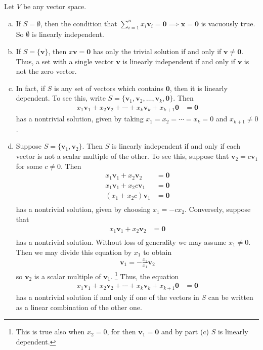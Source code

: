\documentclass[12pt,letterpaper,reqno]{article}
\numberwithin{equation}{section}
\begin{document}
\begin{example}
Let $V$ be any vector space.
\begin{enumerate}[(a)]
	\item If $S=\emptyset$, then the condition that $\sum_{i=1}^nx_i\mathbf{v}_i=\mathbf{0} \implies \mathbf{x}=\mathbf{0}$ is vacuously true. So $\emptyset$ is linearly independent.  
	\item  If $S=\{\mathbf{v}\}$, then $x\mathbf{v}=\mathbf{0}$ has only the trivial solution if and only if $\mathbf{v} \neq \mathbf{0}$. Thus, a set with a single vector $\mathbf{v}$ is linearly independent if and only if $\mathbf{v}$ is not the zero vector.
	\item In fact, if $S$ is any set of vectors which contains $\mathbf{0}$, then it is linearly dependent. To see this, write $S=\{\mathbf{v}_1,\mathbf{v}_2,\dots,\mathbf{v}_k,\mathbf{0}\}$. Then
	\begin{align*}
		x_1\mathbf{v}_1+x_2\mathbf{v}_2+\cdots+x_k\mathbf{v}_k+x_{k+1}\mathbf{0}&=\mathbf{0}
	\end{align*} 
	has a nontrivial solution, given by taking $x_1=x_2=\cdots=x_k=0$ and $x_{k+1} \neq 0$.
	\item Suppose $S=\{\mathbf{v}_1,\mathbf{v}_2\}$. Then $S$ is linearly independent if and only if each vector is not a scalar multiple of the other. To see this, suppose that $\mathbf{v}_2=c\mathbf{v}_1$ for some $c \neq 0$. Then
	\begin{align*}
		x_1\mathbf{v}_1+x_2\mathbf{v}_2&=\mathbf{0} \\
		x_1\mathbf{v}_1+x_2c\mathbf{v}_1&=\mathbf{0} \\
		(x_1+x_2c)\mathbf{v}_1&=\mathbf{0} \\
	\end{align*}
	has a nontrivial solution, given by choosing $x_1=-cx_2$. Conversely, suppose that 
	\begin{align*}
		x_1\mathbf{v}_1+x_2\mathbf{v}_2&=\mathbf{0} \\
	\end{align*}
	has a nontrivial solution. Without loss of generality we may assume $x_1 \neq 0$. Then we may divide this equation by $x_1$ to obtain
	\begin{align*}
		\mathbf{v}_1=-\frac{x_2}{x_1}\mathbf{v}_2
	\end{align*}
	so $\mathbf{v}_2$ is a scalar multiple of $\mathbf{v}_1$. \footnote{This is true also when $x_2=0$, for then $\mathbf{v}_1=\mathbf{0}$ and by part (c) $S$ is linearly dependent.} Thus, the equation
	\begin{align*}
		x_1\mathbf{v}_1+x_2\mathbf{v}_2+\cdots+x_k\mathbf{v}_k+x_{k+1}\mathbf{0}&=\mathbf{0}
	\end{align*}
	has a nontrivial solution if and only if one of the vectors in $S$ can be written as a linear combination of the other one.
\end{enumerate}	
\end{example}
\end{document}
